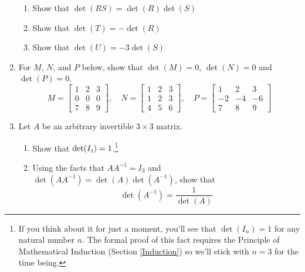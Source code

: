 \begin{enumerate}
\begin{enumerate}

\item Show that $\det(RS) = \det(R)\det(S)$
\item Show that $\det(T) = -\det(R)$
\item Show that $\det(U) = -3\det(S)$

\end{enumerate}

\item For $M$,  $N$, and $P$ below, show that $\det(M) = 0$, $\det(N) = 0$ and $\det(P) = 0$. \[M = \left[ \begin{array}{rrr} 1 & 2 & 3 \\ 0 & 0 & 0 \\ 7 & 8 & 9 \end{array} \right], \quad N = \left[ \begin{array}{rrr} 1 & 2 & 3 \\ 1 & 2 & 3 \\ 4 & 5 & 6 \end{array} \right] , \quad  P =  \left[ \begin{array}{rrr} 1 & 2 & 3 \\ -2 & -4 & -6 \\ 7 & 8 & 9 \end{array} \right]  \]

\pagebreak

\item Let $A$ be an arbitrary invertible $3 \times 3$ matrix.  

\begin{enumerate}

\item Show that $\det(I_{\mbox{\tiny$3$}}) = 1$.\footnote{If you think about it for just a moment, you'll see that $\det(I_{n}) = 1$ for any natural number $n$.  The formal proof of this fact requires the Principle of Mathematical Induction (Section \ref{Induction}) so we'll stick with $n = 3$ for the time being.}

\item Using the facts that $AA^{-1} = I_{3}$ and $\det(AA^{-1}) = \det(A)\det(A^{-1})$, show that \[\det(A^{-1}) = \dfrac{1}{\det(A)}\]

\end{enumerate}

\setcounter{HW}{\value{enumi}}
\end{enumerate}

